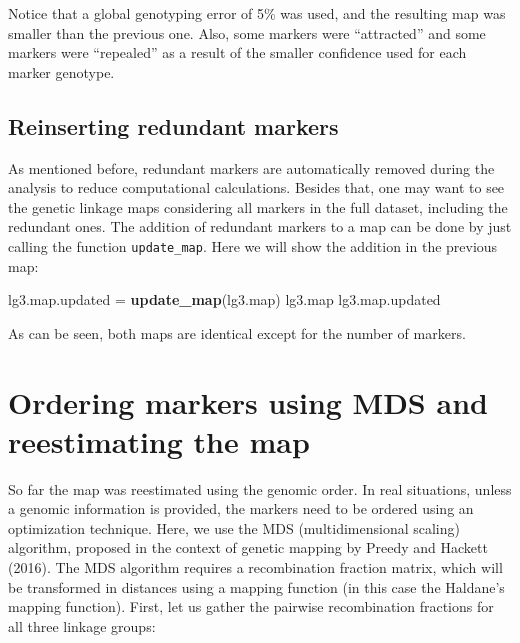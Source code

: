 \documentclass[
]{article}
\newenvironment{Shaded}{}{}
\newcommand{\KeywordTok}[1]{\textcolor[rgb]{0.00,0.44,0.13}{\textbf{#1}}}
\newcommand{\NormalTok}[1]{#1}
\newcommand{\StringTok}[1]{\textcolor[rgb]{0.25,0.44,0.63}{#1}}
\begin{document}
Notice that a global genotyping error of 5\% was used, and the resulting
map was smaller than the previous one. Also, some markers were
``attracted'' and some markers were ``repealed'' as a result of the
smaller confidence used for each marker genotype.

\hypertarget{reinserting-redundant-markers}{%
\subsection{Reinserting redundant
markers}\label{reinserting-redundant-markers}}

As mentioned before, redundant markers are automatically removed during
the analysis to reduce computational calculations. Besides that, one may
want to see the genetic linkage maps considering all markers in the full
dataset, including the redundant ones. The addition of redundant markers
to a map can be done by just calling the function \texttt{update\_map}.
Here we will show the addition in the previous map:

\begin{Shaded}
\begin{Highlighting}[]
\NormalTok{lg3.map.updated =}\StringTok{ }\KeywordTok{update_map}\NormalTok{(lg3.map)}
\NormalTok{lg3.map}
\NormalTok{lg3.map.updated}
\end{Highlighting}
\end{Shaded}

As can be seen, both maps are identical except for the number of
markers.

\hypertarget{ordering-markers-using-mds-and-reestimating-the-map}{%
\section{Ordering markers using MDS and reestimating the
map}\label{ordering-markers-using-mds-and-reestimating-the-map}}

So far the map was reestimated using the genomic order. In real
situations, unless a genomic information is provided, the markers need
to be ordered using an optimization technique. Here, we use the MDS
(multidimensional scaling) algorithm, proposed in the context of genetic
mapping by Preedy and Hackett (2016). The MDS algorithm requires a
recombination fraction matrix, which will be transformed in distances
using a mapping function (in this case the Haldane's mapping function).
First, let us gather the pairwise recombination fractions for all three
linkage groups:
\end{document}
